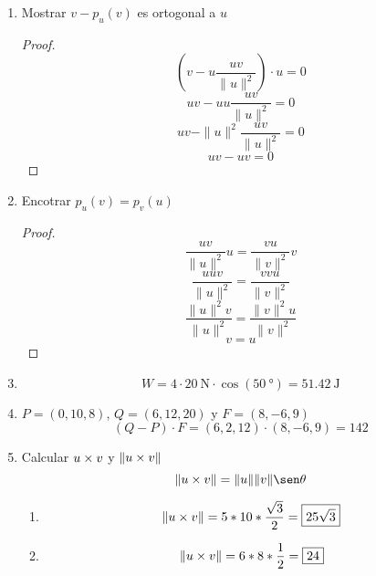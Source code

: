 \documentclass[../practica.root.tex]{subfiles}
\begin{document}
\begin{enumerate}
    \item Mostrar $v - p_u(v)$ es ortogonal a $u$
          \begin{proof}
              \[ \left(v - u\frac{uv}{\|u\|^2}\right)\cdot u = 0 \]
              \[ uv - uu\frac{uv}{\|u\|^2} = 0 \]
              \[ uv - \|u\|^2\frac{uv}{\|u\|^2} = 0 \]
              \[ uv - uv = 0 \]
          \end{proof}

    \item Encotrar $p_u(v) = p_v(u)$
          \begin{proof}
              \[ \frac{uv}{\|u\|^2}u = \frac{vu}{\|v\|^2}v \]
              \[ \frac{uuv}{\|u\|^2} = \frac{vvu}{\|v\|^2} \]
              \[ \frac{\|u\|^2v}{\|u\|^2} = \frac{\|v\|^2u}{\|v\|^2} \]
              \[ v = u \]
          \end{proof}

    \item
          \[ W = 4 \cdot \SI{20}{\newton} \cdot \cos(\SI{50}{\degree}) = \boxed{\SI{51,42}{\joule}}  \]

    \item  $P = (0, 10, 8)$, $Q = (6, 12, 20)$ y $F = (8, -6, 9)$
          \[ (Q - P)\cdot F = (6, 2, 12)\cdot(8, -6, 9) = \boxed{142} \]

    \item Calcular $u \times v$ y $\|u \times v\|$
          \[ \|u \x v\| = \|u\|\|v\|\sen\theta \]
          \begin{enumerate}
              \item
                    \[ \|u \times v\| = 5*10*\frac{\sqrt{3}}{2} = \boxed{25\sqrt{3}} \]
              \item
                    \[ \|u \times v\| = 6*8*\frac{1}{2} = \boxed{24} \]


\end{enumerate}
\end{enumerate}
\end{document}
